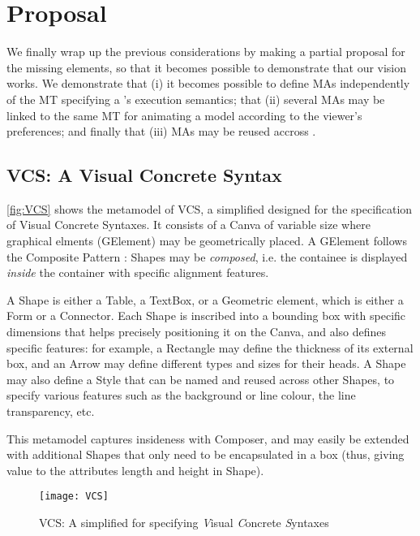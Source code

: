 \section{Proposal}
\label{sec:Proposal}

We finally wrap up the previous considerations by making a partial proposal
for the missing elements, so that it becomes possible to demonstrate that our vision
works. We demonstrate that (i) it becomes possible to define MAs independently of the
MT specifying a \DSL's execution semantics; that (ii) several MAs may be linked to
the same MT for animating a model according to the viewer's preferences; and finally
that (iii) MAs may be reused accross \DSLs.

\subsection{\textsf{VCS}: A Visual Concrete Syntax \DSL}
\label{sec:Proposal-VCS}

\autoref{fig:VCS} shows the metamodel of \textsf{VCS}, a simplified \DSL designed
for the specification of Visual Concrete Syntaxes. It consists of a \textsf{Canva}
of variable size where graphical elments (\textsf{GElement}) may be geometrically
placed. A \textsf{GElement} follows the Composite Pattern \citep{B:Gamma-etAl:1995}:
\textsf{Shape}s may be \emph{composed}, i.e. the \textsf{containee} is displayed
\emph{inside} the \textsf{container} with specific alignment features. 

A \textsf{Shape} is either a \textsf{Table}, a \textsf{TextBox}, or a 
\textsf{Geometric} element, which is either a \textsf{Form} or a 
\textsf{Connector}. Each \textsf{Shape} is inscribed into a bounding box with specific 
dimensions that helps precisely positioning it on the \textsf{Canva}, and also
defines specific features: for example, a Rectangle may define the thickness of its
external box, and an Arrow may define different types and sizes for their heads.
A \textsf{Shape} may also define a \textsf{Style} that can be \textsf{name}d and
reused across other \textsf{Shape}s, to specify various features such as the background
or line colour, the line transparency, etc.

This metamodel captures insideness with \textsf{Composer}, and may easily be extended
with additional \textsf{Shape}s that only need to be encapsulated in a box (thus,
giving value to the attributes \textsf{length} and \textsf{height} in \textsf{Shape}).


\begin{figure}[t]%
   \centering
   \texttt{[image: VCS]}%
   \caption{\textsf{VCS}: A simplified \DSL for specifying \emph{V}isual \emph{C}oncrete \emph{S}yntaxes}%
   \label{fig:VCS}%
\end{figure}


